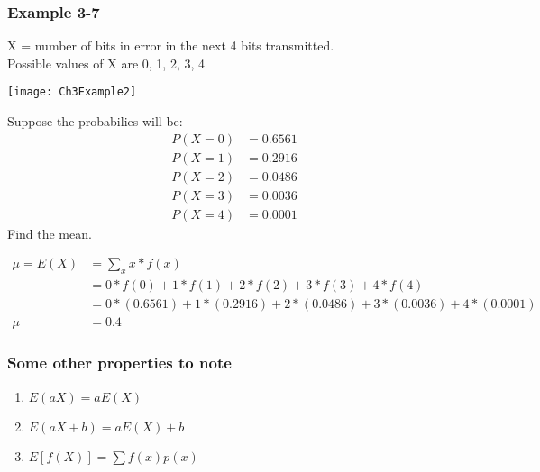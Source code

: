 \documentclass[../INDE315.tex]{subfiles}
\begin{document}
\subsubsection*{Example 3-7}
\begin{exmp}
    X = number of bits in error in the next 4 bits transmitted. \\
    Possible values of X are {0, 1, 2, 3, 4}
    \begin{center}
        \texttt{[image: Ch3Example2]}
    \end{center}
    Suppose the probabilies will be:
    \begin{equation*}
        \begin{aligned}
            P(X = 0) &= 0.6561 \\
            P(X = 1) &= 0.2916 \\
            P(X = 2) &= 0.0486 \\
            P(X = 3) &= 0.0036 \\
            P(X = 4) &= 0.0001 
        \end{aligned}
    \end{equation*} 
    Find the mean.   
\end{exmp}

\begin{equation*}
    \begin{aligned}
        \mu = E(X) &= \sum_{x} x * f(x) \\
                &= 0 * f(0) + 1 * f(1) + 2 * f(2) + 3 * f(3) + 4 * f(4) \\
                &= 0 * (0.6561) + 1 * (0.2916) + 2* (0.0486) + 3 * (0.0036) + 4 * (0.0001) \\
            \mu &= 0.4 
    \end{aligned}
\end{equation*} 

\subsubsection*{Some other properties to note}
\begin{enumerate}
    \item $E(aX) = aE(X)$
    \item $E(aX + b) = aE(X) + b$
    \item $E[f(X)] = \sum f(x) p(x)$
\end{enumerate}
\end{document}
